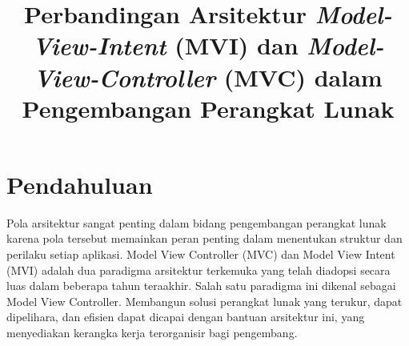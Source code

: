 \documentclass[conference]{IEEEtran}
\begin{document}
\title{Perbandingan Arsitektur \textit{Model-View-Intent} (MVI) dan  \textit{Model-View-Controller }(MVC) dalam Pengembangan Perangkat Lunak\\
}

\author{
\and
{}
\and
{}
\and
{}
\and
{}
}

\maketitle

\begin{abstract}
\end{abstract}

\begin{IEEEkeywords}

\end{IEEEkeywords}

\section{Pendahuluan}
Pola arsitektur sangat penting dalam bidang pengembangan perangkat lunak karena pola tersebut memainkan peran penting dalam menentukan struktur dan perilaku setiap aplikasi. Model View Controller (MVC) dan Model View Intent (MVI) adalah dua paradigma arsitektur terkemuka yang telah diadopsi secara luas dalam beberapa tahun teraakhir. Salah satu paradigma ini dikenal sebagai Model View Controller. Membangun solusi perangkat lunak yang terukur, dapat dipelihara, dan efisien dapat dicapai dengan bantuan arsitektur ini, yang menyediakan kerangka kerja terorganisir bagi pengembang. 
\end{document}
